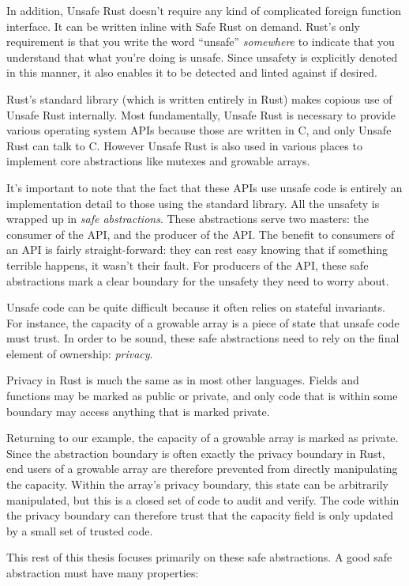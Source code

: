 In addition, Unsafe Rust doesn't require any kind of complicated foreign
function interface. It can be written inline with Safe Rust on demand. Rust's
only requirement is that you write the word ``unsafe'' \emph{somewhere} to indicate
that you understand that what you're doing is unsafe. Since unsafety is
explicitly denoted in this manner, it also enables it to be detected and linted
against if desired.

Rust's standard library (which is written entirely in Rust) makes copious use of
Unsafe Rust internally. Most fundamentally, Unsafe Rust is necessary to provide
various operating system APIs because those are written in C, and only Unsafe
Rust can talk to C. However Unsafe Rust is also used in various places to
implement core abstractions like mutexes and growable arrays.

It's important to note that the fact that these APIs use unsafe code is entirely
an implementation detail to those using the standard library. All the unsafety
is wrapped up in \emph{safe abstractions}. These abstractions serve two masters: the
consumer of the API, and the producer of the API. The benefit to consumers of an
API is fairly straight-forward: they can rest easy knowing that if something
terrible happens, it wasn't their fault. For producers of the API, these safe
abstractions mark a clear boundary for the unsafety they need to worry about.

Unsafe code can be quite difficult because it often relies on stateful
invariants. For instance, the capacity of a growable array is a piece of state
that unsafe code must trust. In order to be sound, these safe abstractions need
to rely on the final element of ownership: \emph{privacy}.

Privacy in Rust is much the same as in most other languages. Fields and functions may be marked
as public or private, and only code that is within some boundary may access anything that is
marked private.

Returning to our example, the capacity of a growable array is marked as private.
Since the abstraction boundary is often exactly the privacy boundary in Rust,
end users of a growable array are therefore prevented from directly manipulating
the capacity. Within the array's privacy boundary, this state can be arbitrarily
manipulated, but this is a closed set of code to audit and verify. The code within
the privacy boundary can therefore trust that the capacity field is only updated
by a small set of trusted code.

This rest of this thesis focuses primarily on these safe abstractions. A good safe abstraction
must have many properties:

